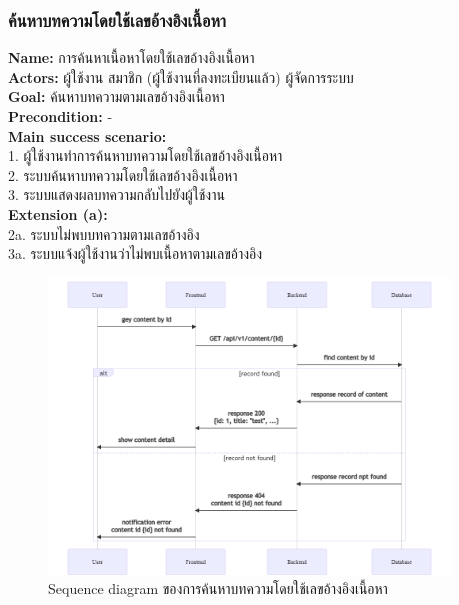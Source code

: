 \documentclass[12pt,oneside,openright,a4paper]{cpe-thai-project}
\begin{document}
\subsubsection{ค้นหาบทความโดยใช้เลขอ้างอิงเนื้อหา}
\textbf{Name: }การค้นหาเนื้อหาโดยใช้เลขอ้างอิงเนื้อหา \\
\textbf{Actors: }ผู้ใช้งาน สมาชิก (ผู้ใช้งานที่ลงทะเบียนแล้ว) ผู้จัดการระบบ \\
\textbf{Goal: }ค้นหาบทความตามเลขอ้างอิงเนื้อหา \\
\textbf{Precondition: }- \\
\textbf{Main success scenario: } \\
  \hspace*{0.5cm}1. ผู้ใช้งานทำการค้นหาบทความโดยใช้เลขอ้างอิงเนื้อหา \\
  \hspace*{0.5cm}2. ระบบค้นหาบทความโดยใช้เลขอ้างอิงเนื้อหา \\
  \hspace*{0.5cm}3. ระบบแสดงผลบทความกลับไปยังผู้ใช้งาน  \\
\textbf{Extension (a): } \\
  \hspace*{0.5cm}2a. ระบบไม่พบบทความตามเลขอ้างอิง \\
  \hspace*{0.5cm}3a. ระบบแจ้งผู้ใช้งานว่าไม่พบเนื้อหาตามเลขอ้างอิง \\ 
\begin{figure}[!ht]\centering
  \includegraphics[width=0.95\textwidth]{./img/seq_searchid.png}
  \caption{Sequence diagram ของการค้นหาบทความโดยใช้เลขอ้างอิงเนื้อหา}\label{fig:seq_content_id} 
\end{figure} 
\end{document}
